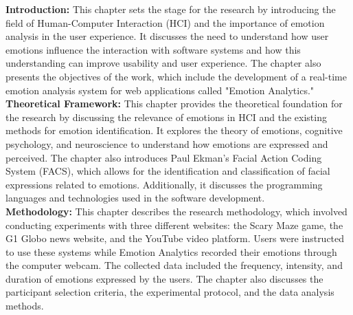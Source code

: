 %  
%  
%

\begin{resumo-ingles}

  \textbf{Introduction:} This chapter sets the stage for the research by introducing the field of Human-Computer Interaction (HCI) and the importance of emotion analysis in the user experience. It discusses the need to understand how user emotions influence the interaction with software systems and how this understanding can improve usability and user experience. The chapter also presents the objectives of the work, which include the development of a real-time emotion analysis system for web applications called "Emotion Analytics."
  \\

  \textbf{Theoretical Framework:} This chapter provides the theoretical foundation for the research by discussing the relevance of emotions in HCI and the existing methods for emotion identification. It explores the theory of emotions, cognitive psychology, and neuroscience to understand how emotions are expressed and perceived. The chapter also introduces Paul Ekman's Facial Action Coding System (FACS), which allows for the identification and classification of facial expressions related to emotions. Additionally, it discusses the programming languages and technologies used in the software development.
  \\

  \textbf{Methodology:} This chapter describes the research methodology, which involved conducting experiments with three different websites: the Scary Maze game, the G1 Globo news website, and the YouTube video platform. Users were instructed to use these systems while Emotion Analytics recorded their emotions through the computer webcam. The collected data included the frequency, intensity, and duration of emotions expressed by the users. The chapter also discusses the participant selection criteria, the experimental protocol, and the data analysis methods.
  \\


\end{resumo-ingles}
